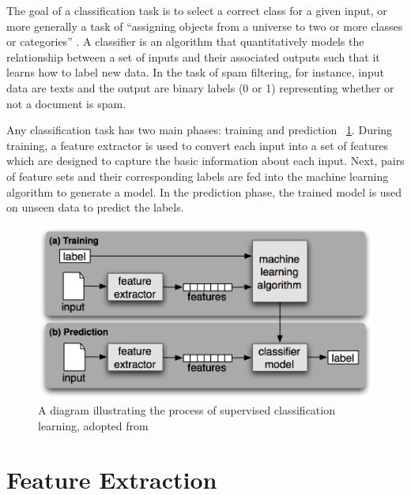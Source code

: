 The goal of a classification task is to select a correct class for a given input, or more generally a task of \enquote{assigning objects from a universe to two or more classes or categories} \citet[][p.575]{manning1999foundations}. A classifier is an algorithm that quantitatively models the relationship between a set of inputs and their associated outputs such that it learns how to label new data. In the task of spam filtering, for instance, input data are texts and the output are binary labels (0 or 1) representing whether or not a document is spam. 

Any classification task has two main phases: training and prediction ~\ref{fig:mlpipeline}. During training, a feature extractor is used to convert each input into a set of features which are designed to capture the basic information about each input. Next, pairs of feature sets and their corresponding labels are fed into the machine learning algorithm to generate a model. In the prediction phase, the trained model is used on unseen data to predict the labels. 

\begin{figure}
\includegraphics[scale=.8]{../Figures/mlpipeline.png} \centering

\caption[Supervised Classification Learning Workflow]{A diagram illustrating the process of supervised classification learning, adopted from ~\citep[p.~222]{bird2009natural}}
\label{fig:mlpipeline}
\end{figure}

\section{Feature Extraction}

